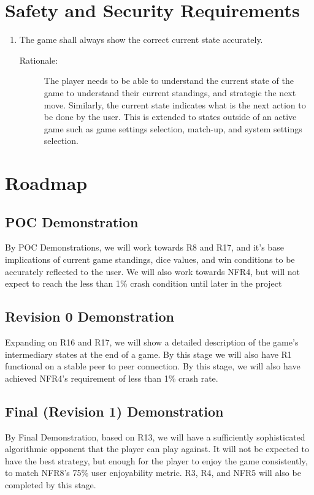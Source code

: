\documentclass{article}
\begin{document}
\clearpage

\newpage{}
\section{Safety and Security Requirements}

\begin{enumerate}[label=R\arabic*, start=17, left=0pt]

    \item The game shall always show the correct current state accurately.
    \begin{description}
        \item[Rationale:] The player needs to be able to understand the current state of the game to understand their current standings, and strategic the next move. Similarly, the current state indicates what is the next action to be done by the user. This is extended to states outside of an active game such as game settings selection, match-up, and system settings selection.
    \end{description}

\end{enumerate}

\section{Roadmap}

\subsection{POC Demonstration}
	By POC Demonstrations, we will work towards R8 and R17, and it's base implications of current game standings, dice values, and win conditions to be accurately reflected to the user. We will also work towards NFR4, but will not expect to reach the less than 1\% crash condition until later in the project
    
    
\subsection{Revision 0 Demonstration}
	Expanding on R16 and R17, we will show a detailed description of the game's intermediary states at the end of a game. By this stage we will also have R1 functional on a stable peer to peer connection. By this stage, we will also have achieved NFR4's requirement of less than 1\% crash rate.
    
\subsection{Final (Revision 1) Demonstration}
	By Final Demonstration, based on R13, we will have a sufficiently sophisticated algorithmic opponent that the player can play against. It will not be expected to have the best strategy, but enough for the player to enjoy the game consistently, to match NFR8's 75\% user enjoyability metric. R3, R4, and NFR5 will also be completed by this stage.
\end{document}
